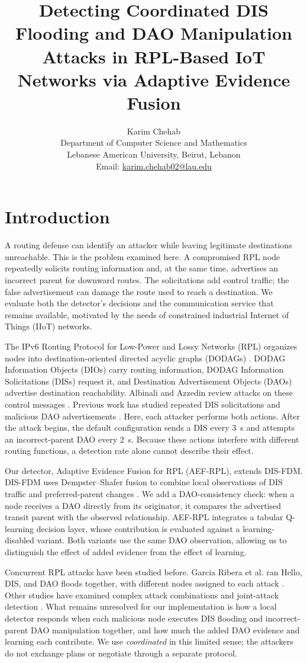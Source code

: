 \documentclass[journal]{IEEEtran}
\title{Detecting Coordinated DIS Flooding and DAO Manipulation Attacks in RPL-Based IoT Networks via Adaptive Evidence Fusion}
\author{Karim Chehab\\[0.5ex]
\normalsize Department of Computer Science and Mathematics\\
\normalsize Lebanese American University, Beirut, Lebanon\\
\normalsize Email: \href{mailto:karim.chehab02@lau.edu}{karim.chehab02@lau.edu}}
\date{}
\begin{document}
\maketitle

\section{Introduction}\label{sec:introduction}
A routing defense can identify an attacker while leaving legitimate destinations unreachable. This is the problem examined here. A compromised RPL node repeatedly solicits routing information and, at the same time, advertises an incorrect parent for downward routes. The solicitations add control traffic; the false advertisement can damage the route used to reach a destination. We evaluate both the detector's decisions and the communication service that remains available, motivated by the needs of constrained industrial Internet of Things (IIoT) networks.

The IPv6 Routing Protocol for Low-Power and Lossy Networks (RPL) organizes nodes into destination-oriented directed acyclic graphs (DODAGs) \cite{rfc6550}. DODAG Information Objects (DIOs) carry routing information, DODAG Information Solicitations (DISs) request it, and Destination Advertisement Objects (DAOs) advertise destination reachability. Albinali and Azzedin review attacks on these control messages \cite{albinali2024}. Previous work has studied repeated DIS solicitations \cite{rajasekar2022,vermaranga2020,medjek2021} and malicious DAO advertisements \cite{pu2018,limsd2024}. Here, each attacker performs both actions. After the attack begins, the default configuration sends a DIS every 3~s and attempts an incorrect-parent DAO every 2~s. Because these actions interfere with different routing functions, a detection rate alone cannot describe their effect.

Our detector, Adaptive Evidence Fusion for RPL (AEF-RPL), extends DIS-FDM. DIS-FDM uses Dempster--Shafer fusion to combine local observations of DIS traffic and preferred-parent changes \cite{prajisha2025}. We add a DAO-consistency check: when a node receives a DAO directly from its originator, it compares the advertised transit parent with the observed relationship. AEF-RPL integrates a tabular Q-learning decision layer, whose contribution is evaluated against a learning-disabled variant. Both variants use the same DAO observation, allowing us to distinguish the effect of added evidence from the effect of learning.

Concurrent RPL attacks have been studied before. Garcia Ribera et al. ran Hello, DIS, and DAO floods together, with different nodes assigned to each attack \cite{garciaribera2022}. Other studies have examined complex attack combinations and joint-attack detection \cite{alsukayti2023,de2rarpl2024,abdulkareem2024}. What remains unresolved for our implementation is how a local detector responds when each malicious node executes DIS flooding and incorrect-parent DAO manipulation together, and how much the added DAO evidence and learning each contribute. We use \emph{coordinated} in this limited sense; the attackers do not exchange plans or negotiate through a separate protocol.
\end{document}
